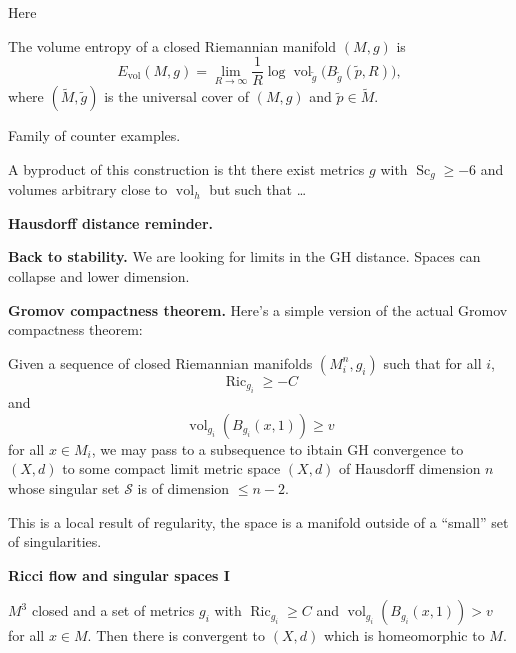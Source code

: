 \noindent
Here
\begin{definition}[AI]
The volume entropy of a closed Riemannian
manifold $(M,g)$ is
\[
E_{\operatorname{vol}}(M,g)
=
\lim_{R\to\infty}
\frac{1}{R}
\log
\operatorname{vol}_{\widetilde g}
\bigl(
B_{\widetilde g}(\widetilde p,R)
\bigr),
\]
where $(\widetilde M,\widetilde g)$ is the
universal cover of $(M,g)$ and
$\widetilde p\in\widetilde M$.
\end{definition}

\begin{theorem}
\label{theorem-ksx}
Family of counter examples.
\end{theorem}

\noindent
A byproduct of this construction is tht
there exist metrics $g$ with 
$\operatorname{Sc}_g \geq  -6$ and volumes
arbitrary close to $\operatorname{vol}_h$
but such that …

\medskip\noindent
{\bf Hausdorff distance reminder.}

\medskip\noindent
{\bf Back to stability.}
We are looking for limits in the GH
distance. Spaces can collapse and lower
dimension.

\medskip\noindent
{\bf Gromov compactness theorem.}
Here's a simple version of the actual
Gromov compactness theorem:

\begin{theorem}
\label{theorem-gct}
Given a sequence of closed Riemannian
manifolds $(M^n_i,g_i)$ such that for all
$i$,
$$
\operatorname{Ric}_{g_i} \geq -C
$$
and
$$
\operatorname{vol}_{g_i}(B_{g_i}(x,1))
\geq v
$$
for all $x \in M_i$,
we may pass to a subsequence to ibtain GH
convergence to $(X,d)$ to some compact limit
metric space $(X,d)$ of Hausdorff dimension
$n$ whose singular set $\mathcal{S}$ is of
dimension $\leq  n-2$.
\end{theorem}

\noindent
This is a local result of regularity,
the space is a manifold outside of a
``small'' set of singularities.

\medskip\noindent
{\bf Ricci flow and singular spaces I}

\begin{theorem}
\label{theorem-sstmt}
$M^3$ closed and a set of metrics $g_i$
with 
$\operatorname{Ric}_{g_i} \geq  C$
and
$\operatorname{vol}_{g_i}(B_{g_i}(x,1))>v$
for all $x \in M$. Then there is convergent
to 
$(X,d)$ which is homeomorphic to $M$.
\end{theorem}


